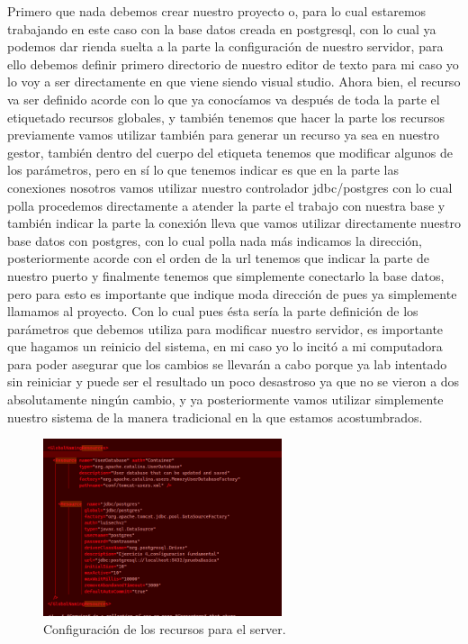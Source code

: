 \documentclass[10pt,a4paper]{article}
\begin{document}
Primero que nada debemos crear nuestro proyecto o, para lo cual estaremos trabajando en este caso con la base datos creada en postgresql, con lo cual ya podemos dar rienda suelta a la parte la configuración de nuestro servidor, para ello debemos definir primero directorio de nuestro editor de texto para mi caso yo lo voy a ser directamente en que viene siendo visual studio. Ahora bien, el recurso va ser definido acorde con lo que ya conocíamos va después de toda la parte el etiquetado recursos globales, y también tenemos que hacer la parte los recursos previamente vamos utilizar también para generar un recurso ya sea en nuestro gestor, también dentro del cuerpo del etiqueta tenemos que modificar algunos de los parámetros, pero en sí lo que tenemos indicar es que en la parte las conexiones nosotros vamos utilizar nuestro controlador jdbc/postgres con lo cual polla procedemos directamente a atender la parte el trabajo con nuestra base y también indicar la parte la conexión lleva que vamos utilizar directamente nuestro base datos con postgres, con lo cual polla nada más indicamos la dirección, posteriormente acorde con el orden de la url tenemos que indicar la parte de nuestro puerto y finalmente tenemos que simplemente conectarlo la base datos, pero para esto es importante que indique moda dirección de pues ya simplemente llamamos al proyecto. Con lo cual pues ésta sería la parte definición de los parámetros que debemos utiliza para modificar nuestro servidor, es importante que hagamos un reinicio del sistema, en mi caso yo lo incitó a mi computadora para poder asegurar que los cambios se llevarán a cabo porque ya lab intentado sin reiniciar y puede ser el resultado un poco desastroso ya que no se vieron a dos absolutamente ningún cambio, y ya posteriormente vamos utilizar simplemente nuestro sistema de la manera tradicional en la que estamos acostumbrados.
\vspace{5mm}
\begin{figure}[h]
\centering
\includegraphics[width=7cm]{1XX}
\caption{Configuración de los recursos para el server.}
\label{fig:re1}
\end{figure}
\end{document}
